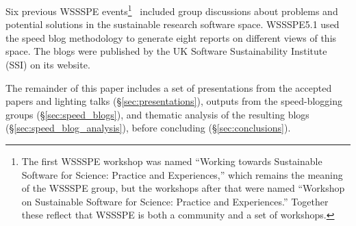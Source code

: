 \documentclass[11pt,letterpaper]{article}
\begin{document}
Six previous WSSSPE events\footnote{The first WSSSPE workshop was named ``Working towards Sustainable Software for Science: Practice and Experiences,'' which remains the meaning of the WSSSPE group, but the workshops after that were named ``Workshop on Sustainable Software for Science: Practice and Experiences.'' Together these reflect that WSSSPE is both a community and a set of workshops.}~\cite{WSSSPE1-pre-report,WSSSPE1,WSSSPE2-pre-report,WSSSPE2}
%
included 
group discussions about problems and potential solutions in the sustainable research software space.  WSSSPE5.1 used the speed blog methodology to generate eight reports on different views of this space. The blogs were published by the UK Software Sustainability Institute (SSI) on its website.



The remainder of this paper includes %
a set of presentations from the accepted papers and lighting talks (\S\ref{sec:presentations}), outputs from the speed-blogging groups (\S\ref{sec:speed_blogs}), and thematic analysis of the resulting blogs (\S\ref{sec:speed_blog_analysis}),
before concluding (\S\ref{sec:conclusions}).
\end{document}
